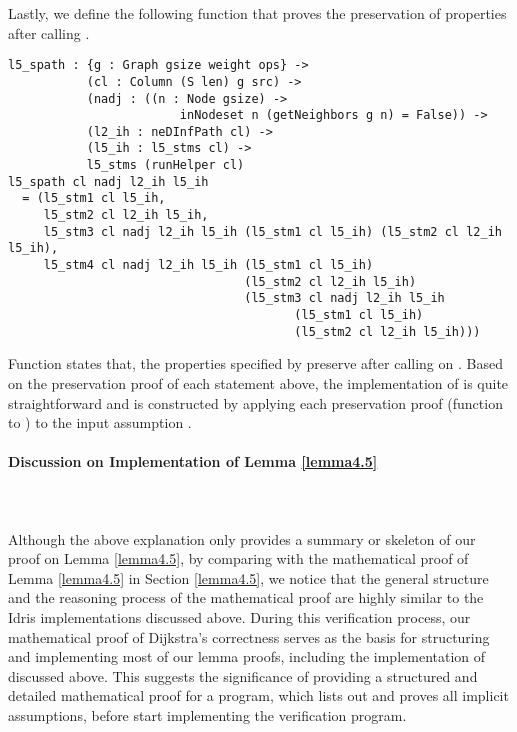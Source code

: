 Lastly, we define the following  function that proves the preservation of  properties after calling . 
\begin{lstlisting}
l5_spath : {g : Graph gsize weight ops} ->
           (cl : Column (S len) g src) ->
           (nadj : ((n : Node gsize) -> 
           				inNodeset n (getNeighbors g n) = False)) ->
           (l2_ih : neDInfPath cl) ->
           (l5_ih : l5_stms cl) ->
           l5_stms (runHelper cl)
l5_spath cl nadj l2_ih l5_ih
  = (l5_stm1 cl l5_ih,
     l5_stm2 cl l2_ih l5_ih,
     l5_stm3 cl nadj l2_ih l5_ih (l5_stm1 cl l5_ih) (l5_stm2 cl l2_ih l5_ih),
     l5_stm4 cl nadj l2_ih l5_ih (l5_stm1 cl l5_ih)
                                 (l5_stm2 cl l2_ih l5_ih)
                                 (l5_stm3 cl nadj l2_ih l5_ih 
                                 		(l5_stm1 cl l5_ih) 
                                 		(l5_stm2 cl l2_ih l5_ih)))
\end{lstlisting}

Function  states that, the properties specified by  preserve after calling  on . Based on the preservation proof of each statement above, the implementation of  is quite straightforward and is constructed by applying each preservation proof (function  to ) to the input assumption .  

\paragraph*{Discussion on Implementation of Lemma \ref{lemma4.5}}
\tab\\\\
Although the above explanation only provides a summary or skeleton of our proof on Lemma \ref{lemma4.5}, by comparing with the mathematical proof of Lemma \ref{lemma4.5} in Section \ref{lemma4.5}, we notice that the general structure and the reasoning process of the mathematical proof are highly similar to the Idris implementations discussed above. During this verification process, our mathematical proof of Dijkstra's correctness serves as the basis for structuring and implementing most of our lemma proofs, including the implementation of  discussed above. This suggests the significance of providing a structured and detailed mathematical proof for a program, which lists out and proves all implicit assumptions, before start implementing the verification program. 
\\

